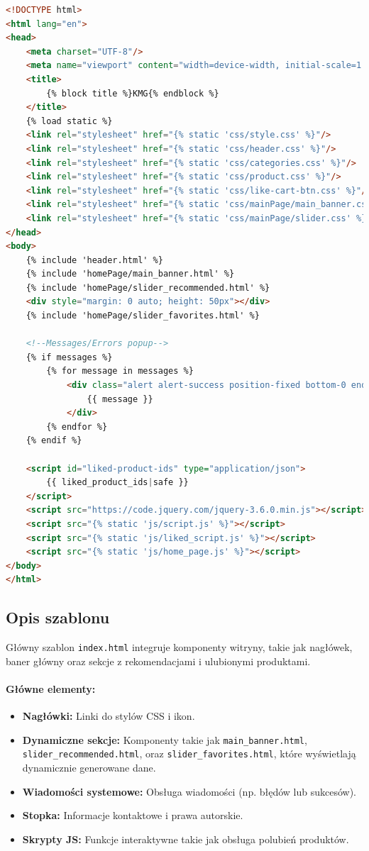 \documentclass[12pt,a4paper,oneside]{article}
\theoremstyle{definition}
\numberwithin{equation}{section}
\begin{document}
\begin{lstlisting}[language=HTML]
<!DOCTYPE html>
<html lang="en">
<head>
    <meta charset="UTF-8"/>
    <meta name="viewport" content="width=device-width, initial-scale=1.0 shrink-to-fit=no"/>
    <title>
        {% block title %}KMG{% endblock %}
    </title>
    {% load static %}
    <link rel="stylesheet" href="{% static 'css/style.css' %}"/>
    <link rel="stylesheet" href="{% static 'css/header.css' %}"/>
    <link rel="stylesheet" href="{% static 'css/categories.css' %}"/>
    <link rel="stylesheet" href="{% static 'css/product.css' %}"/>
    <link rel="stylesheet" href="{% static 'css/like-cart-btn.css' %}"/>
    <link rel="stylesheet" href="{% static 'css/mainPage/main_banner.css' %}"/>
    <link rel="stylesheet" href="{% static 'css/mainPage/slider.css' %}"/>
</head>
<body>
    {% include 'header.html' %}
    {% include 'homePage/main_banner.html' %}
    {% include 'homePage/slider_recommended.html' %}
    <div style="margin: 0 auto; height: 50px"></div>
    {% include 'homePage/slider_favorites.html' %}

    <!--Messages/Errors popup-->
    {% if messages %}
        {% for message in messages %}
            <div class="alert alert-success position-fixed bottom-0 end-0 m-3" id="messagePopUp">
                {{ message }}
            </div>
        {% endfor %}
    {% endif %}

    <script id="liked-product-ids" type="application/json">
        {{ liked_product_ids|safe }}
    </script>
    <script src="https://code.jquery.com/jquery-3.6.0.min.js"></script>
    <script src="{% static 'js/script.js' %}"></script>
    <script src="{% static 'js/liked_script.js' %}"></script>
    <script src="{% static 'js/home_page.js' %}"></script>
</body>
</html>
\end{lstlisting}

\subsection*{Opis szablonu}
Główny szablon \texttt{index.html} integruje komponenty witryny, takie jak nagłówek, baner główny oraz sekcje z rekomendacjami i ulubionymi produktami. 

\paragraph{Główne elementy:}
\begin{itemize}
    \item \textbf{Nagłówki:} Linki do stylów CSS i ikon.
    \item \textbf{Dynamiczne sekcje:} Komponenty takie jak \texttt{main\_banner.html}, \texttt{slider\_recommended.html}, oraz \texttt{slider\_favorites.html}, które wyświetlają dynamicznie generowane dane.
    \item \textbf{Wiadomości systemowe:} Obsługa wiadomości (np. błędów lub sukcesów).
    \item \textbf{Stopka:} Informacje kontaktowe i prawa autorskie.
    \item \textbf{Skrypty JS:} Funkcje interaktywne takie jak obsługa polubień produktów.
\end{itemize}
\end{document}

